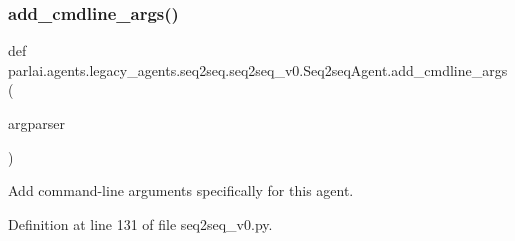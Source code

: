 \subsubsection{\texorpdfstring{add\+\_\+cmdline\+\_\+args()}{add\_cmdline\_args()}}
{\footnotesize\ttfamily def parlai.\+agents.\+legacy\+\_\+agents.\+seq2seq.\+seq2seq\+\_\+v0.\+Seq2seq\+Agent.\+add\+\_\+cmdline\+\_\+args (\begin{DoxyParamCaption}\item[{}]{argparser }\end{DoxyParamCaption})\hspace{0.3cm}{\ttfamily [static]}}

\begin{DoxyVerb}Add command-line arguments specifically for this agent.
\end{DoxyVerb}
 

Definition at line 131 of file seq2seq\+\_\+v0.\+py.


